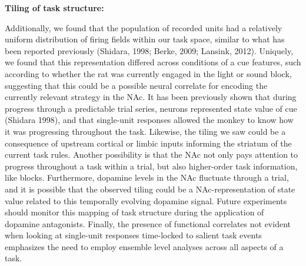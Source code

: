 \documentclass[11pt]{article}
\begin{document}
{\bf Tiling of task structure:}

Additionally, we found that the population of recorded units had a relatively uniform distribution of firing fields within our task space, similar to what has been reported previously (Shidara, 1998; Berke, 2009; Lansink, 2012). Uniquely, we found that this representation differed across conditions of a cue features, such according to whether the rat was currently engaged in the light or sound block, suggesting that this could be a possible neural correlate for encoding the currently relevant strategy in the NAc. It has been previously shown that during progress through a predictable trial series, neurons represented state value of cue (Shidara 1998), and that single-unit responses allowed the monkey to know how it was progressing throughout the task. Likewise, the tiling we saw could be a consequence of upstream cortical or limbic inputs informing the striatum of the current task rules. Another possibility is that the NAc not only pays attention to progress throughout a task within a trial, but also higher-order task information, like blocks. Furthermore, dopamine levels in the NAc fluctuate through a trial, and it is possible that the observed tiling could be a NAc-representation of state value related to this temporally evolving dopamine signal. Future experiments should monitor this mapping of task structure during the application of dopamine antagonists. Finally, the presence of functional correlates not evident when looking at single-unit responses time-locked to salient task events emphasizes the need to employ ensemble level analyses across all aspects of a task.



\end{document}

